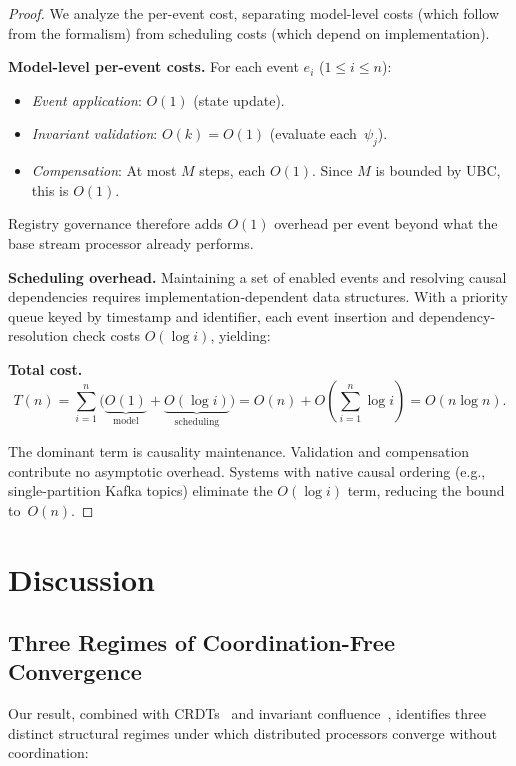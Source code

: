 \documentclass[11pt,a4paper]{article}
\theoremstyle{plain}
\theoremstyle{definition}
\theoremstyle{remark}
\begin{document}
\begin{proof}
We analyze the per-event cost, separating model-level costs (which follow from
the formalism) from scheduling costs (which depend on implementation).

\textbf{Model-level per-event costs.}  For each event $e_i$
($1 \leq i \leq n$):
\begin{itemize}[leftmargin=*,nosep]
\item \emph{Event application}: $O(1)$ (state update).
\item \emph{Invariant validation}: $O(k) = O(1)$ (evaluate each~$\psi_j$).
\item \emph{Compensation}: At most $M$ steps, each $O(1)$.  Since $M$ is
  bounded by UBC, this is $O(1)$.
\end{itemize}
Registry governance therefore adds $O(1)$ overhead per event beyond what the
base stream processor already performs.

\textbf{Scheduling overhead.}  Maintaining a set of enabled events and
resolving causal dependencies requires implementation-dependent data
structures.  With a priority queue keyed by timestamp and identifier, each
event insertion and dependency-resolution check costs $O(\log i)$, yielding:

\textbf{Total cost.}
\[
T(n) = \sum_{i=1}^n \bigl(\underbrace{O(1)}_{\text{model}} +
  \underbrace{O(\log i)}_{\text{scheduling}}\bigr)
     = O(n) + O\!\left(\sum_{i=1}^n \log i\right)
     = O(n \log n).
\]

The dominant term is causality maintenance.  Validation and compensation
contribute no asymptotic overhead.  Systems with native causal ordering (e.g.,
single-partition Kafka topics) eliminate the $O(\log i)$ term, reducing the
bound to~$O(n)$.
\end{proof}

\section{Discussion}
\label{sec:discussion}

\subsection{Three Regimes of Coordination-Free Convergence}
\label{sec:design-space}

Our result, combined with CRDTs~\cite{shapiro2011crdt} and invariant
confluence~\cite{bailis2014coordination}, identifies three distinct structural
regimes under which distributed processors converge without coordination:
\end{document}
